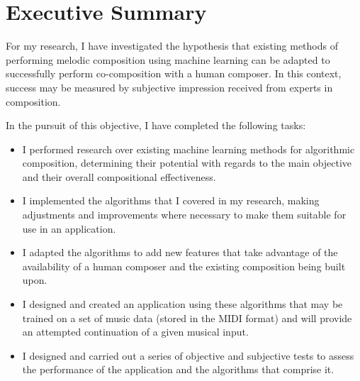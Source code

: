 \documentclass[ author={Stephen Livermore-Tozer},
				supervisor={Dr. Peter Flach},
				degree={MEng},
				title={Algorithmic Co-composition Using Machine Learning},
				subtitle={},
				type={research},
				year={2016} ]{dissertation}
\begin{document}
	
	\maketitle
	
	\frontmatter
	
	\makedecl
	
	\tableofcontents
	\lstlistoflistings
	
	
	\chapter*{Executive Summary}
	
	For my research, I have investigated the hypothesis that existing methods of performing melodic composition using machine learning can be adapted to successfully perform co-composition with a human composer. In this context, success may be measured by subjective impression received from experts in composition. 
	
	In the pursuit of this objective, I have completed the following tasks:
	\begin{itemize}
		\item I performed research over existing machine learning methods for algorithmic composition, determining their potential with regards to the main objective and their overall compositional effectiveness.
		\item I implemented the algorithms that I covered in my research, making adjustments and improvements where necessary to make them suitable for use in an application.
		\item I adapted the algorithms to add new features that take advantage of the availability of a human composer and the existing composition being built upon.
		\item I designed and created an application using these algorithms that may be trained on a set of music data (stored in the MIDI format) and will provide an attempted continuation of a given musical input.
		\item I designed and carried out a series of objective and subjective tests to assess the performance of the application and the algorithms that comprise it.
	\end{itemize}
	
	
	
\end{document}
